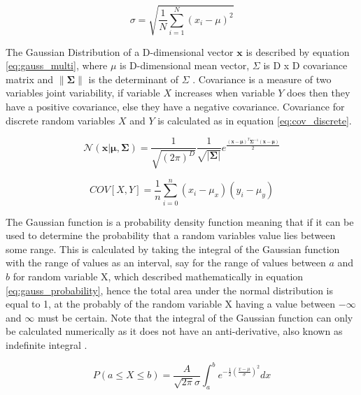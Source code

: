 \begin{equation}
  \sigma = \sqrt{\frac{1}{N}\sum_{i=1}^{N}(x_i - \mu)^2}
  \label{eq:standard_deviation}
\end{equation}

The Gaussian Distribution of a D-dimensional vector $\boldsymbol{x}$ is described by equation \ref{eq:gauss_multi}, where \textbf{$\mu$} is D-dimensional mean vector, \textbf{$\Sigma$} is D x D covariance matrix and $\|\boldsymbol{\Sigma}\|$ is the determinant of \textbf{$\Sigma$} \cite{patterns_machine_learning}. Covariance is a measure of two variables joint variability, if variable $X$ increases when variable $Y$ does then they have a positive covariance, else they have a negative covariance. Covariance for discrete random variables $X$ and $Y$ is calculated as in equation \ref{eq:cov_discrete}.

\begin{equation}
  \mathcal{N}(\boldsymbol{x}|\boldsymbol{\mu},\boldsymbol{\Sigma}) = \frac{1}{\sqrt{(2\pi)^D}}\frac{1}{\sqrt{|\boldsymbol{\Sigma}|}}e^{\frac{(\boldsymbol{x}-\boldsymbol{\mu})^T\boldsymbol{\Sigma}^{-1}(\boldsymbol{x}-\boldsymbol{\mu})}{2}}
\label{eq:gauss_multi}
\end{equation}

\begin{equation}
   COV[X,Y] = \frac{1}{n}\sum_{i = 0}^{n}(x_i - \mu_x)(y_i - \mu_y)
\label{eq:cov_discrete}
\end{equation}

The Gaussian function is a probability density function meaning that if it can be used to determine the probability that a random variables value lies between some range. This is calculated by taking the integral of the Gaussian function with the range of values as an interval, say for the range of values between $a$ and $b$ for random variable X, which described mathematically in equation \ref{eq:gauss_probability}, hence the total area under the normal distribution is equal to 1, at the probably of the random variable X having a value between $-\infty$ and $\infty$ must be certain. Note that the integral of the Gaussian function can only be calculated numerically as it does not have an anti-derivative, also known as indefinite integral \cite{antiderivatives}. 

\begin{equation}
  P(a \leq X \leq b) = \frac{A}{\sqrt{2\pi}\sigma}\int_{a}^{b}e^{-\frac{1}{2}(\frac{x-\mu}{\sigma})^2}dx
\label{eq:gauss_probability}
\end{equation}


